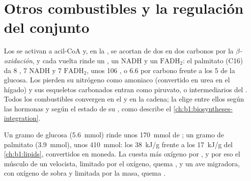 \section{Otros combustibles y la regulación del conjunto}

\begin{proposition}\label{prop:b1:respiration-fermentation:otherfuels}
Los  se activan a acil-CoA y, en la , se
acortan de dos en dos carbonos por la \emph{$\beta$-oxidación}, y cada
vuelta rinde un , un NADH y un $\mathrm{FADH_2}$: el palmitato
(C16) da 8 , 7 NADH y 7 $\mathrm{FADH_2}$, unos 106 , o
\qty{6.6}{}  por carbono frente a los 5 de la glucosa. Los 
pierden su nitrógeno como amoniaco (convertido en urea en el hígado) y sus
esqueletos carbonados entran como piruvato,  o intermediarios del
. Todos los combustibles convergen en el  y en la
cadena; la  elige entre ellos según las hormonas y según el estado de
su , como describe el \cref{ch:b1:biosyntheses-integration}.
\end{proposition}

\begin{example}\label{ex:b1:respiration-fermentation:gramofeach}
Un gramo de glucosa (\qty{5.6}{mmol}) rinde unos \qty{170}{mmol} de ; un
gramo de palmitato (\qty{3.9}{mmol}), unos \qty{410}{mmol}: los
\qty{38}{kJ/g} frente a los \qty{17}{kJ/g} del \cref{ch:b1:lipids},
convertidos en moneda. La  cuesta más oxígeno por , y por eso el
músculo de un velocista, limitado por el oxígeno, quema , y un ave
migradora, con oxígeno de sobra y limitada por la masa, quema .
\end{example}

